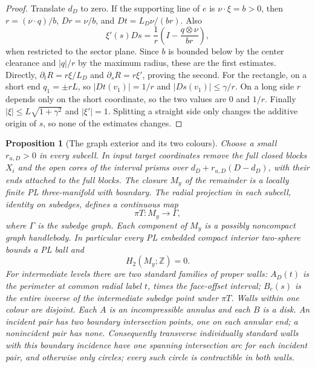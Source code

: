 \documentclass[11pt]{article}
\numberwithin{equation}{section}
\newtheorem{proposition}[theorem]{Proposition}
\theoremstyle{definition}
\theoremstyle{remark}
\begin{document}
\begin{proof}
Translate $d_D$ to zero.  If the supporting line of $e$ is
$\nu\cdot\xi=b>0$, then $r=(\nu\cdot q)/b$,
$Dr=\nu/b$, and $Dt=L_D\nu/(br)$.  Also
\[
 \xi'(s)D s=\frac1r\left(I-\frac{q\otimes\nu}{br}\right),
\]
when restricted to the sector plane.  Since $b$ is bounded below by
the center clearance and $|q|/r$ by the maximum radius, these are the
first estimates.  Directly,
$\partial_tR=r\xi/L_D$ and $\partial_sR=r\xi'$, proving the second.
For the rectangle, on a short end $q_1=\pm rL$, so
$|D t(v_1)|=1/r$ and $|D s(v_1)|\leq\gamma/r$.
On a long side $r$ depends only on the short coordinate, so the two
values are $0$ and $1/r$.  Finally $|\xi|\leq L\sqrt{1+\gamma^2}$
and $|\xi'|=1$.  Splitting a straight side only changes the additive
origin of $s$, so none of the estimates changes.
\end{proof}

\begin{proposition}[The graph exterior and its two colours]\label{qt:exterior}
Choose a small $r_{u,D}>0$ in every subcell.  In input target
coordinates remove the full closed blocks $X_i$ and the open cores
of the interval prisms over
$d_D+r_{u,D}(D-d_D)$, with their ends attached to the full blocks.
The closure $M_y$ of the remainder is a locally finite PL
three-manifold with boundary.  The radial projection in each subcell,
identity on subedges, defines a continuous map
\[
 \pi T:M_y\longrightarrow\Gamma,
\]
where $\Gamma$ is the subedge graph.  Each component of $M_y$ is a
possibly noncompact graph handlebody.  In particular every PL embedded compact
interior two-sphere bounds a PL ball and
\begin{equation}\label{qt:exterior-homology}
 H_2(M_y;\mathbb Z)=0.
\end{equation}
For intermediate levels there are two standard families of proper
walls: $A_D(t)$ is the perimeter at common radial label $t$, times
the face-offset interval; $B_e(s)$ is the entire inverse of the
intermediate subedge point under $\pi T$.  Walls within one colour are
disjoint.  Each $A$ is an incompressible annulus and each $B$ is a disk.
An incident pair has two boundary intersection points, one on each
annular end; a nonincident pair has none.  Consequently transverse
individually standard walls with this boundary incidence have one
spanning intersection arc for each incident pair, and otherwise only
circles; every such circle is contractible in both walls.
\end{proposition}
\end{document}
